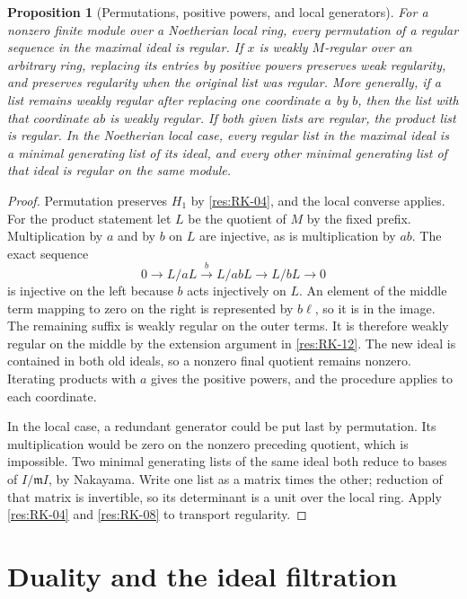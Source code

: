 \documentclass[11pt,oneside,openany]{book}
\newtheorem{proposition}[theorem]{Proposition}
\theoremstyle{definition}
\theoremstyle{remark}
\begin{document}
\begin{proposition}[Permutations, positive powers, and local generators]
\label{res:RK-09}
For a nonzero finite module over a Noetherian local ring, every
permutation of a regular sequence in the maximal ideal is regular.
If $x$ is weakly $M$-regular over an arbitrary ring, replacing its
entries by positive powers preserves weak regularity, and preserves
regularity when the original list was regular. More generally,
if a list remains weakly regular after replacing one coordinate
$a$ by $b$, then the list with that coordinate $ab$ is weakly
regular. If both given lists are regular, the product list is regular.
In the Noetherian
local case, every regular list in the maximal ideal is a minimal
generating list of its ideal, and every other minimal generating
list of that ideal is regular on the same module.
\end{proposition}
\begin{proof}
Permutation preserves $H_1$ by \ref{res:RK-04}, and the local
converse applies. For the product statement let $L$ be the quotient
of $M$ by the fixed prefix. Multiplication by $a$ and by $b$ on $L$
are injective, as is multiplication by $ab$. The exact sequence
\[
 0\longrightarrow L/aL\xrightarrow{\ b\ }L/abL
   \longrightarrow L/bL\longrightarrow0
\]
is injective on the left because $b$ acts injectively on $L$.
An element of the middle term mapping to zero on the right is
represented by $b\ell$, so it is in the image. The remaining suffix
is weakly regular on the outer terms. It is therefore weakly regular
on the middle by the extension argument in \ref{res:RK-12}.
The new ideal is contained in both old ideals, so a nonzero final
quotient remains nonzero. Iterating products with $a$ gives the
positive powers, and the procedure applies to each coordinate.

In the local case, a redundant generator could be put last by
permutation. Its multiplication would be zero on the nonzero
preceding quotient, which is impossible. Two minimal generating
lists of the same ideal both reduce to bases of
$I/\mathfrak m I$, by Nakayama. Write one list as a matrix
times the other; reduction of that matrix is invertible, so its
determinant is a unit over the local ring. Apply \ref{res:RK-04}
and \ref{res:RK-08} to transport regularity.
\end{proof}

\section{Duality and the ideal filtration}
\end{document}
